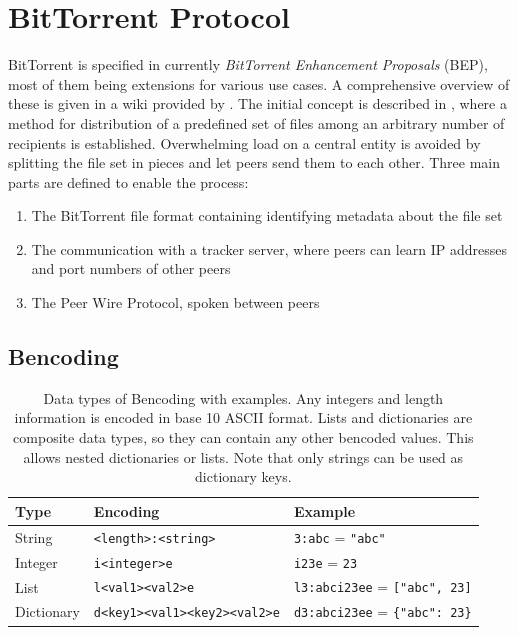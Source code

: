 \documentclass[10pt, a4paper, twoside, headsepline]{scrbook}
\renewcommand{\_}{\origunderscore\allowbreak}
\begin{document}
\section{BitTorrent Protocol}
\label{bittorrent}
BitTorrent is specified in currently  \emph{BitTorrent Enhancement Proposals} (BEP), most of them being extensions for various use cases. A comprehensive overview of these is given in a wiki provided by \textcite{theoryorg}. The initial concept is described in \cite{bep3}, where a method for distribution of a predefined set of files among an arbitrary number of recipients is established. Overwhelming load on a central entity is avoided by splitting the file set in pieces and let peers send them to each other. Three main parts are defined to enable the process:

\begin{enumerate}
  \item The BitTorrent file format containing identifying metadata about the file set
  \item The communication with a tracker server, where peers can learn IP addresses and port numbers of other peers
  \item The Peer Wire Protocol, spoken between peers
\end{enumerate}

\subsection{Bencoding}
\begin{table}
\centering
\begin{tabular}{lll}
\toprule
Type & Encoding & Example \\
\midrule
String & \texttt{<length>:<string>} & \texttt{3:abc} = \texttt{"abc"} \\
Integer & \texttt{i<integer>e} & \texttt{i23e} = \texttt{23} \\
List & \texttt{l<val1><val2>e} & \texttt{l3:abci23ee} = \texttt{["abc", 23]} \\
Dictionary & \texttt{d<key1><val1><key2><val2>e} & \texttt{d3:abci23ee} = \texttt{\{"abc": 23\}} \\
\bottomrule
\end{tabular}
\caption[Data types and their encoding in Bencoding]{Data types of Bencoding with examples. Any integers and length information is encoded in base 10 ASCII format. Lists and dictionaries are composite data types, so they can contain any other bencoded values. This allows nested dictionaries or lists. Note that only strings can be used as dictionary keys.}
\label{bencode}
\end{table}
\end{document}
